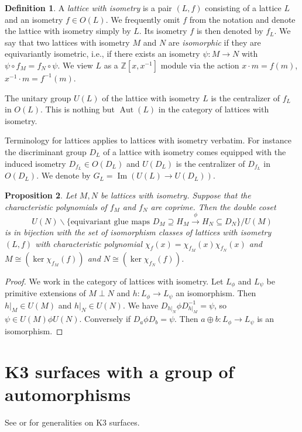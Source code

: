 \documentclass[a4paper]{amsart}
\theoremstyle{definition}
\newtheorem{definition}{Definition}[section]
\theoremstyle{plain}
\newtheorem{proposition}[definition]{Proposition}
\DeclareMathOperator{\Aut}{Aut}
\newcommand{\ZZ}{\mathbb{Z}}
\newcommand{\disc}[1]{{D_{#1}}}
\newcommand{\im}{\operatorname{Im}}
\begin{document}
\begin{definition}
A \emph{lattice with isometry} is a pair $(L,f)$ consisting of a lattice $L$ and an isometry $f \in O(L)$.
We frequently omit $f$ from the notation and denote the lattice with isometry simply by $L$. Its isometry $f$ is then denoted by $f_L$.
We say that two lattices with isometry $M$ and $N$ are \emph{isomorphic}
if they are equivariantly isometric, i.e., if there exists an isometry
$\psi \colon M \to N$ with $\psi \circ f_{M} = f_{N} \circ \psi$.
We view $L$ as a $\ZZ[x,x^{-1}]$ module via the action $x \cdot m = f(m)$, $x^{-1} \cdot m = f^{-1}(m)$.
\end{definition}
The unitary group $U(L)$ of the lattice with isometry $L$ is the centralizer of $f_L$ in $O(L)$. This is nothing but $\Aut(L)$ in the category of lattices with isometry.

Terminology for lattices applies to lattices with isometry verbatim. For instance the discriminant group $D_L$ of a lattice with isometry comes equipped with the induced isometry $D_{f_L} \in O(D_L)$ and
$U(D_L)$ is the centralizer of $D_{f_L}$ in $O(D_L)$. We denote by
$G_L = \im( U(L) \to U(D_L))$.

\begin{proposition}\label{extensions}
Let $M,N$ be lattices with isometry.
Suppose that the characteristic polynomials of $f_M$ and $f_N$ are coprime.
Then the double coset
\[U(N) \backslash \{\mbox{equivariant glue maps } \disc{M} \supseteq H_M \xrightarrow{\phi } H_N \subseteq D_{N} \} / U(M)\]
is in bijection with the set of isomorphism classes of lattices with isometry $(L,f)$ with characteristic polynomial $\chi_f(x) = \chi_{f_{M}}(x)\chi_{f_{N}}(x)$ and $M \cong (\ker \chi_{f_M}(f))$ and $N \cong (\ker \chi_{f_N}(f))$.
\end{proposition}
\begin{proof}
We work in the category of lattices with isometry. Let $L_\phi$ and $L_{\psi}$ be primitive extensions of $M \perp N$ and $h\colon L_\phi \to L_\psi$ an isomorphism.
Then $h|_M \in U(M)$ and $h|_N \in U(N)$.
We have $D_{h|_N}\phi D_{h|_M}^{-1} = \psi$, so $\psi \in U(M) \phi U(N)$.
Conversely if $D_a \phi D_b = \psi$. Then $a \oplus b \colon L_\phi \to L_\psi$ is an isomorphism.
\end{proof}


\section{K3 surfaces with a group of automorphisms}\label{k3moduli}
See \cite{bhpv} or \cite{huybrechts2016} for generalities on K3 surfaces.
\end{document}
